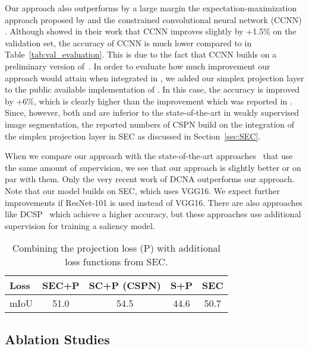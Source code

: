\documentclass{bmvc2k}
\begin{document}
	Our approach also outperforms by a large margin the expectation-maximization approach proposed by  \citet{papandreou2015weakly} and the constrained convolutional neural network (CCNN) \citep{pathak2015constrained}. Although \citet{pathak2015constrained} showed in their work that CCNN improves \cite{papandreou2015weakly} slightly by +1.5\% on the validation set, the accuracy of CCNN is much lower compared to \cite{papandreou2015weakly} in Table~\ref{tab:val_evaluation}. This is due to the fact that CCNN builds on a preliminary version of~\cite{papandreou2015weakly}. In order to evaluate how much improvement our approach would attain when integrated in \cite{papandreou2015weakly}, we added our simplex projection layer to the public available implementation of \cite{papandreou2015weakly}. In this case, the accuracy is improved by +6\%, which is clearly higher than the improvement which was reported in \cite{pathak2015constrained}. Since, however, both \cite{papandreou2015weakly} and \cite{pathak2015constrained} are inferior to the state-of-the-art in weakly supervised image segmentation, the reported numbers of CSPN build on the integration of the simplex projection layer in SEC as discussed in Section~\ref{sec:SEC}.           
	
	When we compare our approach with the state-of-the-art approaches~\cite{kim2017two,roy2017combining} that use the same amount of supervision, we see that our approach is slightly better or on par with them. Only the very recent work of DCNA \cite{zhang2018decoupled} outperforms our approach. Note that our model builds on SEC, which uses VGG16. We expect further improvements if ResNet-101 is used instead of VGG16. There are also approaches like DCSP~\cite{chaudhry2017discovering} which achieve a higher accuracy, but these approaches use additional supervision for training a saliency model. 

	\begin{table}[t]
	\centering
		\begin{tabular}{lccc|c}
			\hline
		Loss	& SEC+P & SC+P (CSPN) & S+P & SEC \\
		\hline
		mIoU & 51.0 & 54.5 & 44.6 & 50.7\\
			\hline
		\end{tabular}
		  \caption{Combining the projection loss (P) with additional loss functions from SEC.} \label{tab:SEC_loss}
		\end{table}

\subsection{Ablation Studies}
\end{document}
